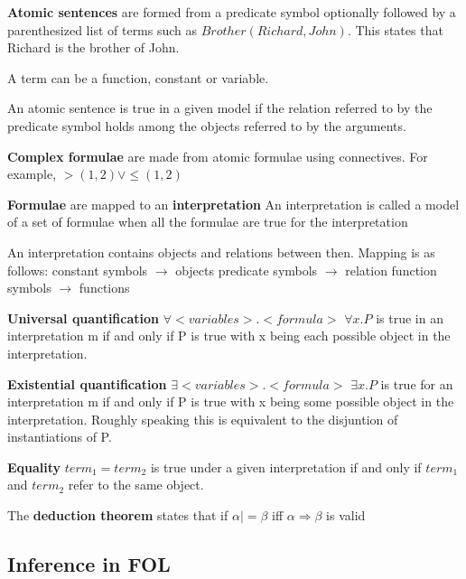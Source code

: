 \documentclass{article}
\begin{document}
\textbf{Atomic sentences} are formed from a predicate symbol optionally followed by a parenthesized list of terms such as $Brother(Richard,John)$. This states that Richard is the brother of John.

A term can be a function, constant or variable. \newline

An atomic sentence is true in a given model if the relation referred to by the predicate symbol holds among the objects referred to by the arguments. \newline 

\textbf{Complex formulae} are made from atomic formulae using connectives. For example, $>(1,2) \vee \leq(1,2)$ \newline

\textbf{Formulae} are mapped to an \textbf{interpretation} \newline 
An interpretation is called a model of a set of formulae when all the formulae are true for the interpretation \newline

An interpretation contains objects and relations between then. Mapping is as follows:
constant symbols $\rightarrow$ objects
predicate symbols $\rightarrow$ relation
function symbols $\rightarrow$ functions \newline 

\textbf{Universal quantification}
$\forall <variables>.<formula>$
$\forall x.P$ is true in an interpretation m if and only if P is true with x being each possible object in the interpretation. \newline

\textbf{Existential quantification}
$\exists <variables>.<formula>$
$\exists x. P$ is true for an interpretation m if and only if P is true with x being some possible object in the interpretation. Roughly speaking this is equivalent to the disjuntion of instantiations of P. \newline

\textbf{Equality}
$term_1 = term_2$ is true under a given interpretation if and only if $term_1$ and $term_2$ refer to the same object. \newline

The \textbf{deduction theorem} states that if $\alpha |= \beta$ iff $\alpha \Rightarrow \beta$ is valid

\subsection{Inference in FOL}
\end{document}
